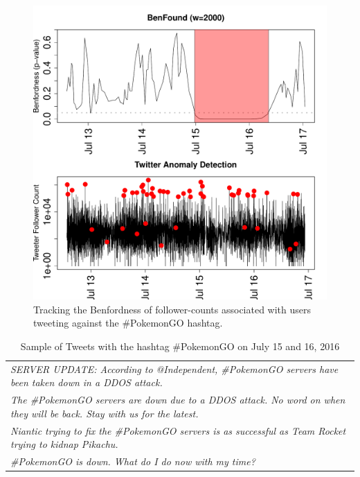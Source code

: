 \documentclass[twoside,leqno,twocolumn]{article}\usepackage[]{graphicx}\usepackage[]{color}
\makeatletter
\def\maxwidth{ %
  \ifdim\Gin@nat@width>\linewidth
    \linewidth
  \else
    \Gin@nat@width
  \fi
}
\newenvironment{knitrout}{}{} %
\makeatother
\begin{document}
\begin{knitrout}
\color{fgcolor}\begin{figure}[t]
\includegraphics[width=\maxwidth]{figure/case-study-pokemon-1} \caption[Tracking the Benfordness of follower-counts associated with users tweeting against the \#PokemonGO hashtag]{Tracking the Benfordness of follower-counts associated with users tweeting against the \#PokemonGO hashtag.}\label{fig:case-study-pokemon}
\end{figure}


\end{knitrout}

\begin{table}[h!]
  \footnotesize
  \centering
  \begin{tabular}{|p{8cm}|}
    \hline
    \textit{SERVER UPDATE: According to @Independent, \#PokemonGO servers have been taken down in a DDOS attack.} \\
    \textit{The \#PokemonGO servers are down due to a DDOS attack. No word on when they will be back. Stay with us for the latest.} \\
    \textit{Niantic trying to fix the \#PokemonGO servers is as successful as Team Rocket trying to kidnap Pikachu.} \\
    \textit{\#PokemonGO is down. What do I do now with my time?} \\
    \hline
  \end{tabular}
  \caption{Sample of Tweets with the hashtag \#PokemonGO on July 15 and 16, 2016}
  \label{tab:sampleTweetsPokemon}
\end{table}
\end{document}
